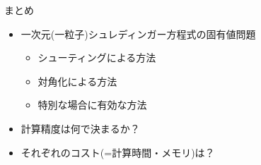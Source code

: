 \documentclass[dvipdfmx]{beamer}
\begin{document}
\begin{frame}[t,fragile]{まとめ}
  \begin{itemize}
    \setlength{\itemsep}{1em}
  \item 一次元(一粒子)シュレディンガー方程式の固有値問題
    \begin{itemize}
    \item シューティングによる方法
    \item 対角化による方法
    \item 特別な場合に有効な方法
    \end{itemize}
  \item 計算精度は何で決まるか？
  \item それぞれのコスト(=計算時間・メモリ)は？
  \end{itemize}
\end{frame}
\end{document}
